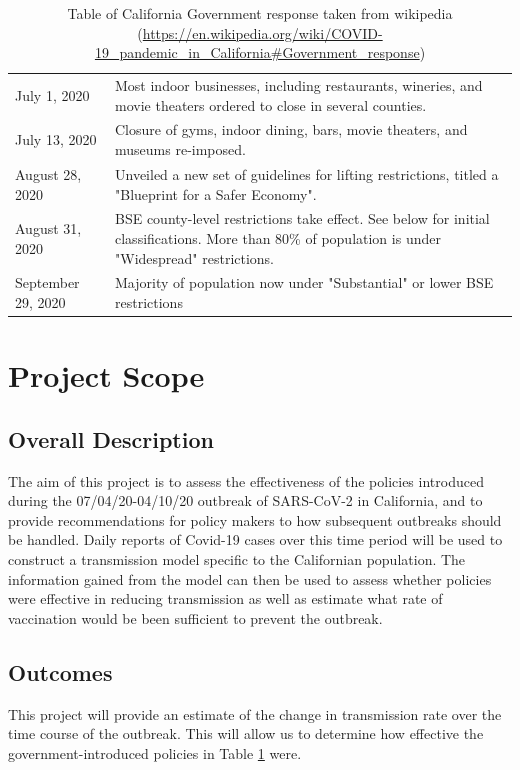 \documentclass[11pt]{article}
\begin{document}
\begin{table}[H]
\begin{tabular}{p{.25\linewidth}|p{.75\linewidth}}
            July 1, 2020 & 	Most indoor businesses, including restaurants, wineries, and movie theaters ordered to close in several counties. \\
            July 13, 2020 & 	Closure of gyms, indoor dining, bars, movie theaters, and museums re-imposed. \\
            August 28, 2020 & 	Unveiled a new set of guidelines for lifting restrictions, titled a "Blueprint for a Safer Economy". \\
            August 31, 2020 &	BSE county-level restrictions take effect. See below for initial classifications. More than 80\% of population is under "Widespread" restrictions. \\
            September 29, 2020 & Majority of population now under "Substantial" or lower BSE restrictions
        \end{tabular}
        \caption{Table of California Government response taken from wikipedia (\url{https://en.wikipedia.org/wiki/COVID-19\_pandemic\_in\_California\#Government\_response})}
        \label{wiki_table}
    \end{table}
\section{Project Scope}
\subsection{Overall Description}
The aim of this project is to assess the effectiveness of the policies introduced during the 07/04/20-04/10/20 outbreak of
SARS-CoV-2 in California, and to provide recommendations for policy makers to how subsequent outbreaks should be handled.
Daily reports of Covid-19 cases over this time period will be used to construct a transmission model specific to the 
Californian population.  The information gained from the model can then be used to assess whether policies were effective
in reducing transmission as well as estimate what rate of vaccination would be been sufficient to prevent the outbreak.

\subsection{Outcomes}
This project will provide an estimate of the change in transmission rate over the time course of the outbreak. This will
allow us to determine how effective the government-introduced policies in Table \ref{wiki_table} were.
\end{document}
